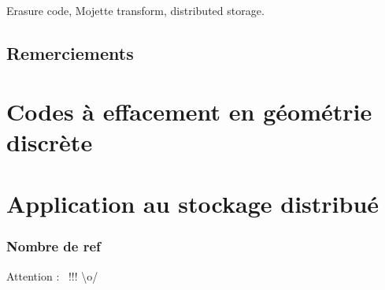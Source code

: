 \begin{keywords}
    Erasure code, Mojette transform, distributed storage.
\end{keywords}

\maketitle

\chapter*{Remerciements}

\lipsum[1-2]

\newpage

\dominitoc
\tableofcontents

\part{Codes à effacement en géométrie discrète}







\part{Application au stockage distribué}







\printbibliography[
]



\section*{Nombre de ref}
Attention : \ !!! \textbackslash{}o/

\backmatter


